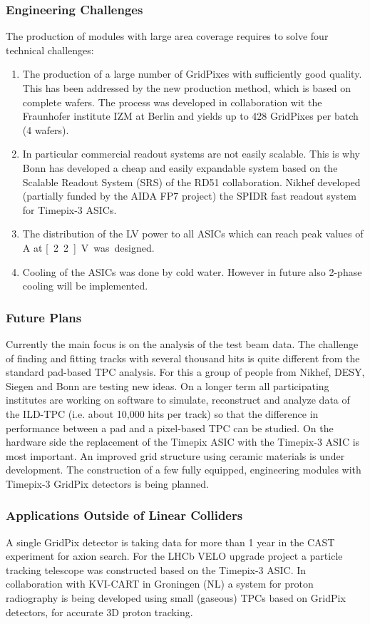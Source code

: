 \subsubsection{Engineering Challenges}
The production of modules with large area coverage requires to solve four
technical challenges:
\begin{enumerate}
\item The production of a large number of GridPixes with sufficiently good
quality. This has been addressed by the new production method, which is based
on complete wafers. The process was developed in collaboration wit the
Fraunhofer institute IZM at Berlin and yields up to 428 GridPixes per batch (4 wafers).

\item In particular commercial readout systems are not easily scalable. This is why Bonn has developed a cheap and easily expandable system based on the Scalable Readout System (SRS) of the RD51 collaboration.
Nikhef developed (partially funded by the AIDA FP7 project) the SPIDR fast readout system for Timepix-3 ASICs.

\item The distribution of the LV power to all ASICs which can reach peak values
of \unit[85]{A} at \unit[2.2]{V} was designed.

\item Cooling of the ASICs was done by cold water. However in future also 2-phase  cooling will be implemented.
\end{enumerate}

\subsubsection{Future Plans}
Currently the main focus is on the analysis of the test beam data. The
challenge of finding and fitting tracks with several thousand hits is quite
different from the standard pad-based TPC analysis. For this a group of people
from Nikhef, DESY, Siegen and Bonn are testing new ideas. On a longer term all
participating institutes are working on software to simulate, reconstruct and
analyze data of the ILD-TPC (i.e. about 10,000 hits per track) so that the
difference in performance between a pad and a pixel-based TPC can be studied.
On the hardware side the replacement of the Timepix ASIC with the Timepix-3
ASIC is most important.
An improved grid structure using ceramic materials is under development.
The construction of a few fully equipped, engineering modules with Timepix-3
GridPix detectors is being planned.

\subsubsection{Applications Outside of Linear Colliders}
A single GridPix detector is taking data for more than 1 year in the CAST
experiment for axion search.
For the LHCb VELO upgrade project a particle tracking telescope was constructed
based on the Timepix-3 ASIC.
In collaboration with KVI-CART in Groningen (NL) a system for proton radiography
is being developed using small (gaseous) TPCs based on GridPix detectors, for
accurate 3D proton tracking.
